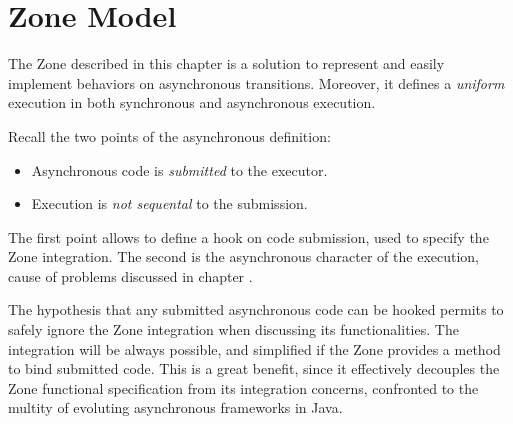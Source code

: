 
\chapter{Zone Model}
\label{ch:zone}

The Zone described in this chapter is a solution to represent and easily implement behaviors on asynchronous transitions. Moreover, it defines a \emph{uniform} execution in both synchronous and asynchronous execution. 

Recall the two points of the asynchronous definition:
\begin{itemize}
\item Asynchronous code is \emph{submitted} to the executor.
\item Execution is \emph{not sequental} to the submission.
\end{itemize}

The first point allows to define a hook on code submission, used to specify the Zone integration. The second is the asynchronous character of the execution, cause of problems discussed in chapter \label{ch:modiv}.

The hypothesis that any submitted asynchronous code can be hooked permits to safely ignore the Zone integration when discussing its functionalities. The integration will be always possible, and simplified if the Zone provides a method to bind submitted code. This is a great benefit, since it effectively decouples the Zone functional specification from its integration concerns, confronted to the multity of evoluting asynchronous frameworks in Java.












